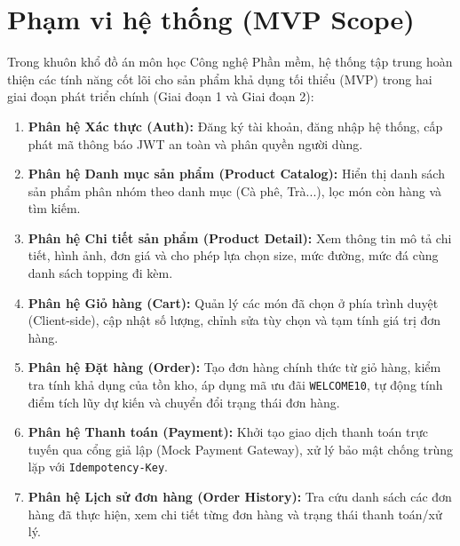 \documentclass[12pt,a4paper,oneside]{report}
\begin{document}
\section{Phạm vi hệ thống (MVP Scope)}
Trong khuôn khổ đồ án môn học Công nghệ Phần mềm, hệ thống tập trung hoàn thiện các tính năng cốt lõi cho sản phẩm khả dụng tối thiểu (MVP) trong hai giai đoạn phát triển chính (Giai đoạn 1 và Giai đoạn 2):

\begin{enumerate}
    \item \textbf{Phân hệ Xác thực (Auth):} Đăng ký tài khoản, đăng nhập hệ thống, cấp phát mã thông báo JWT an toàn và phân quyền người dùng.
    \item \textbf{Phân hệ Danh mục sản phẩm (Product Catalog):} Hiển thị danh sách sản phẩm phân nhóm theo danh mục (Cà phê, Trà...), lọc món còn hàng và tìm kiếm.
    \item \textbf{Phân hệ Chi tiết sản phẩm (Product Detail):} Xem thông tin mô tả chi tiết, hình ảnh, đơn giá và cho phép lựa chọn size, mức đường, mức đá cùng danh sách topping đi kèm.
    \item \textbf{Phân hệ Giỏ hàng (Cart):} Quản lý các món đã chọn ở phía trình duyệt (Client-side), cập nhật số lượng, chỉnh sửa tùy chọn và tạm tính giá trị đơn hàng.
    \item \textbf{Phân hệ Đặt hàng (Order):} Tạo đơn hàng chính thức từ giỏ hàng, kiểm tra tính khả dụng của tồn kho, áp dụng mã ưu đãi \texttt{WELCOME10}, tự động tính điểm tích lũy dự kiến và chuyển đổi trạng thái đơn hàng.
    \item \textbf{Phân hệ Thanh toán (Payment):} Khởi tạo giao dịch thanh toán trực tuyến qua cổng giả lập (Mock Payment Gateway), xử lý bảo mật chống trùng lặp với \texttt{Idempotency-Key}.
    \item \textbf{Phân hệ Lịch sử đơn hàng (Order History):} Tra cứu danh sách các đơn hàng đã thực hiện, xem chi tiết từng đơn hàng và trạng thái thanh toán/xử lý.
\end{enumerate}
\end{document}

